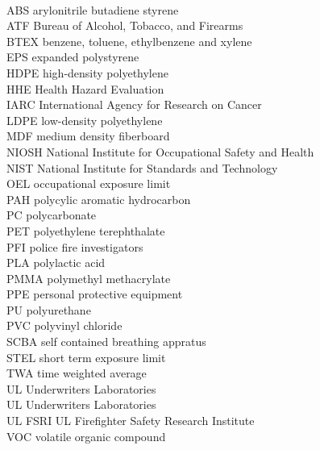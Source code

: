 \documentclass[12pt,oneside]{book}
\begin{document}
\begin{tabbing}
\hspace{1.5in} \= \\
ABS 	    \> arylonitrile butadiene styrene \\
ATF 	    \> Bureau of Alcohol, Tobacco, and Firearms \\
BTEX 	    \> benzene, toluene, ethylbenzene and xylene \\
EPS 	    \> expanded polystyrene  \\
HDPE 	    \> high-density polyethylene \\
HHE 	    \> Health Hazard Evaluation \\
IARC 	    \> International Agency for Research on Cancer \\
LDPE 	    \> low-density polyethylene  \\
MDF 	    \> medium density fiberboard \\
NIOSH 	    \> National Institute for Occupational Safety and Health \\
NIST 	    \> National Institute for Standards and Technology \\
OEL 	    \> occupational exposure limit \\
PAH 	    \> polycylic aromatic hydrocarbon \\
PC 	  	  	\> polycarbonate  \\
PET 	    \> polyethylene terephthalate \\
PFI 	    \> police fire investigators \\
PLA 	    \> polylactic acid \\
PMMA 	    \> polymethyl methacrylate \\
PPE 	    \> personal protective equipment \\
PU 	  	  	\> polyurethane   \\
PVC 	    \> polyvinyl chloride \\
SCBA 	    \> self contained breathing appratus \\
STEL 	    \> short term exposure limit \\
TWA 	    \> time weighted average \\
UL 	    	\> Underwriters Laboratories \\
UL 	    	\> Underwriters Laboratories \\
UL FSRI 	\> UL Firefighter Safety Research Institute \\
VOC 	    \> volatile organic compound \\
\end{tabbing}
\end{document}
